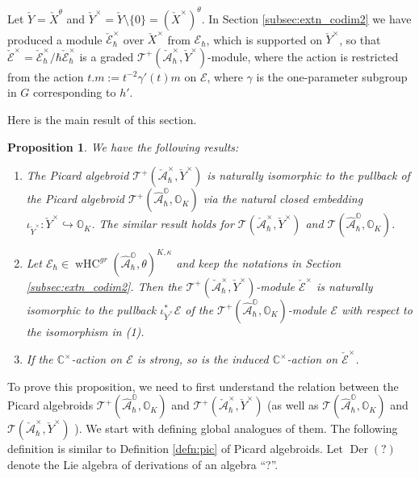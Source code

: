 \documentclass[12pt]{amsart}
\newcommand{\C}{\mathbb{C}}
\newcommand{\A}{\mathcal{A}}
\newcommand{\Orb}{\mathbb{O}}
\newcommand{\TT}{\mathscr{T}}
\newcommand{\cm}{\C^\times}
\newcommand{\EE}{\mathcal{E}}
\newcommand{\wHC}{\operatorname{wHC}}
\newcommand{\Ecal}{\mathcal{E}}
\newcommand{\der}{{\operatorname{Der}}}
\newtheorem{Prop}[Thm]{Proposition}
\theoremstyle{definition}
\numberwithin{equation}{section}
\begin{document}
Let $\check{Y} = \check{X}^\theta$ and $\check{Y}^\times = \check{Y} \setminus \{ 0 \} = (\check{X}^\times)^\theta$. In Section \ref{subsec:extn_codim2} we have produced a module $\check{\Ecal}^\times_\hbar$ over $\check{X}^\times$ from $\EE_\hbar$, which is supported on $\check{Y}^\times$, so that $\check{\mathcal{E}}^\times = \check{\mathcal{E}}_\hbar^\times/\hbar \check{\mathcal{E}}_\hbar^\times$ is a graded $\TT^+(\check{\A}_\hbar^\times, \check{Y}^\times)$-module,
where the action is restricted from the action $t.m:=t^{-2}\gamma'(t)m$ on $\mathcal{E}$, where $\gamma$ is the one-parameter subgroup in $G$ corresponding to $h'$.

Here is the main result of this section.

\begin{Prop}\label{Prop:slice_strongness}
We have the following results:
	\begin{enumerate}
		\item
		The Picard algebroid  $\TT^+(\check{\A}_\hbar^\times, \check{Y}^\times)$ is naturally isomorphic to the pullback of the Picard algebroid $\TT^+(\hat{\A}_\hbar^{\Orb}, \Orb_K)$ via the natural closed embedding $\iota_{\check{Y}^\times} : \check{Y}^\times \hookrightarrow \Orb_K$. The similar result holds for $\TT(\check{\A}_\hbar^\times, \check{Y}^\times)$ and $\TT(\hat{\A}_\hbar^{\Orb}, \Orb_K)$.
		\item
		 Let $\mathcal{E}_\hbar\in\wHC^{gr}(\hat{\A}_\hbar^{\Orb},\theta)^{K,\kappa}$ and keep the notations in Section \ref{subsec:extn_codim2}. Then the $\TT^+(\check{\A}_\hbar^\times, \check{Y}^\times)$-module $\check{\mathcal{E}}^\times$ is naturally isomorphic to the pullback $\iota_{\check{Y}^\times}^* \EE$ of the $\TT^+(\hat{\A}_\hbar^{\Orb}, \Orb_K)$-module $\EE$ with respect to the isomorphism in (1).
		\item
		If the $\cm$-action on $\EE$ is strong, so is the induced $\cm$-action on $\check{\mathcal{E}}^\times$.
	\end{enumerate}	
\end{Prop}

To prove this proposition, we need to first understand the relation between the Picard algebroids $\TT^+(\hat{\A}_\hbar^\Orb, \Orb_K)$ and $\TT^+(\check{\A}_\hbar^\times, \check{Y}^\times)$ (as well as $\TT(\hat{\A}_\hbar^\Orb, \Orb_K)$ and $\TT(\check{\A}_\hbar^\times, \check{Y}^\times)$ ). We start with defining global analogues of them. The following definition is similar to Definition \ref{defn:pic} of Picard algebroids. Let $\der(?)$ denote the Lie algebra of derivations of an algebra ``?''.
\end{document}
